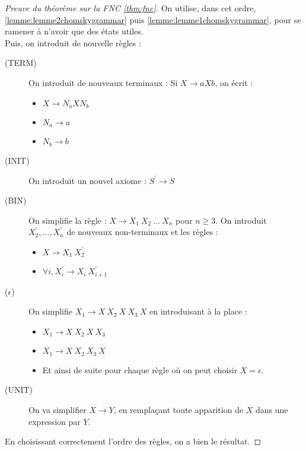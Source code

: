 \documentclass{cours}
\begin{document}
\begin{proof}[Preuve du théorème sur la FNC \ref{thm:fnc}]
    On utilise, dans cet ordre, \ref{lemme:lemme2chomskygrammar} puis \ref{lemme:lemme1chomskygrammar}, pour se ramener à n'avoir que des états utiles.\\
    Puis, on introduit de nouvelle règles : 
    \begin{description}
        \item[(TERM)] On introduit de nouveaux terminaux : Si $X \rightarrow a X b$, on écrit : 
        \begin{itemize}
            \item $X \rightarrow N_{a} X N_{b}$
            \item $N_{a} \rightarrow a$
            \item $N_{b} \rightarrow b$
        \end{itemize}
        \item[(INIT)] On introduit un nouvel axiome : $S^{'} \rightarrow S$
        \item[(BIN)] On simplifie la règle : $X\rightarrow X_{1}\ X_{2} \ \ldots \ X_{n}$ pour $n \geq 3$.
        On introduit $X_{2}^{'}, \ldots, X_{n}^{'}$ de nouveaux non-terminaux et les règles : 
        \begin{itemize}
            \item $X\rightarrow X_{1} \ X_{2}^{'}$
            \item $\forall i, X_{i}^{'} \rightarrow X_{i} \ X_{i+1}^{'}$
        \end{itemize}
        \item[($\epsilon$)] On simplifie $X_{1} \rightarrow X\ X_{2} \ X \ X_{3} \ X $ en introduisant à la place : 
        \begin{itemize}
            \item $X_{1} \rightarrow X \ X_{2} \ X \ X_3$
            \item $X_{1} \rightarrow X \ X_{2} \ X_3 \ X$
            \item Et ainsi de suite pour chaque règle où on peut choisir $X = \epsilon$.
        \end{itemize}
        \item[(UNIT)] On va simplifier $X \rightarrow Y$, en remplaçant toute apparition de $X$ dans une expression par $Y$. 
    \end{description}
    En choisissant correctement l'ordre des règles, on a bien le résultat. 
\end{proof}
\end{document}
